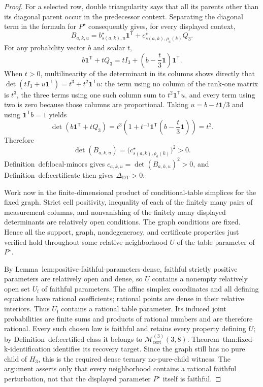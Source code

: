 \documentclass{article}
\begin{document}
\begin{proof}
For a selected row, double triangularity says that all its parents other than its diagonal parent occur in the predecessor context.  Separating the diagonal term in the formula for \(P^{\star}\) consequently gives, for every displayed context,
\[
 B_{a,k,u}
 =b^{\star}_{s(a,k),u}\mathbf 1^{\mathsf T}
  +c^{\star}_{s(a,k),\rho_a(k)}Q_3.
\]
For any probability vector \(b\) and scalar \(t\),
\[
 b\mathbf 1^{\mathsf T}+tQ_3
 =tI_3+\left(b-\frac t3\mathbf 1\right)\mathbf 1^{\mathsf T}.
\]
When \(t>0\), multilinearity of the determinant in its columns shows directly that
\(\det(tI_3+u\mathbf 1^{\mathsf T})=t^3+t^2\mathbf 1^{\mathsf T}u\): the term using no column of the rank-one matrix is \(t^3\), the three terms using one such column sum to \(t^2\mathbf 1^{\mathsf T}u\), and every term using two is zero because those columns are proportional.  Taking \(u=b-t\mathbf 1/3\) and using \(\mathbf 1^{\mathsf T}b=1\) yields
\[
 \det\!\left(b\mathbf 1^{\mathsf T}+tQ_3\right)
 =t^3\left(1+t^{-1}\mathbf 1^{\mathsf T}
       \left(b-\frac t3\mathbf 1\right)\right)
 =t^2.
\]
Therefore
\[
 \det(B_{a,k,u})
 =\bigl(c^{\star}_{s(a,k),\rho_a(k)}\bigr)^2>0.
\]
Definition~\textnormal{def:local-minors} gives \(c_{a,k,u}=\det(B_{a,k,u})^2>0\), and Definition~\textnormal{def:certificate} then gives \(\Delta_{\mathrm{DT}}>0\).

Work now in the finite-dimensional product of conditional-table simplices for the fixed graph.  Strict cell positivity, inequality of each of the finitely many pairs of measurement columns, and nonvanishing of the finitely many displayed determinants are relatively open conditions.  The graph conditions are fixed.  Hence all the support, graph, nondegeneracy, and certificate properties just verified hold throughout some relative neighborhood \(U\) of the table parameter of \(P^{\star}\).

By Lemma~\textnormal{lem:positive-faithful-parameters-dense}, faithful strictly positive parameters are relatively open and dense, so \(U\) contains a nonempty relatively open set \(U_{\mathrm f}\) of faithful parameters.  The affine simplex coordinates and all defining equations have rational coefficients; rational points are dense in their relative interiors.  Thus \(U_{\mathrm f}\) contains a rational table parameter.  Its induced joint probabilities are finite sums and products of rational numbers and are therefore rational.  Every such chosen law is faithful and retains every property defining \(U\); by Definition~\textnormal{def:certified-class} it belongs to \(\mathcal M_{\mathrm{cert}}^{(3)}(3,8)\).  Theorem~\textnormal{thm:fixed-k-identification} identifies its recovery target.  Since the graph still has no pure child of \(H_3\), this is the required dense ternary no-pure-child witness.  The argument asserts only that every neighborhood contains a rational faithful perturbation, not that the displayed parameter \(P^{\star}\) itself is faithful.
\end{proof}
\end{document}
